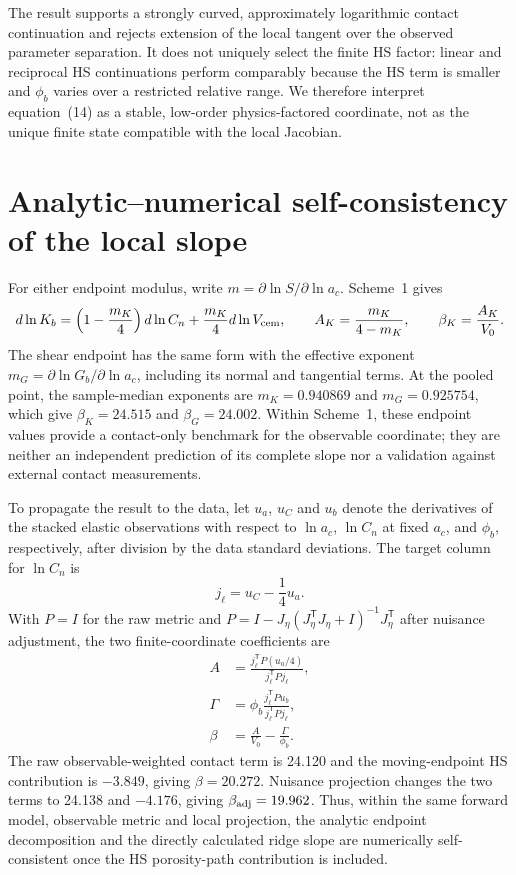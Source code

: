 The result supports a strongly curved, approximately logarithmic contact
continuation and rejects extension of the local tangent over the observed
parameter separation.  It does not uniquely select the finite HS factor:
linear and reciprocal HS continuations perform comparably because the HS
term is smaller and $\phi_b$ varies over a restricted relative range.  We
therefore interpret equation~(14) as a stable, low-order physics-factored
coordinate, not as the unique finite state compatible with the local
Jacobian.

\section{Analytic--numerical self-consistency of the local slope}

For either endpoint modulus, write
$m=\partial\ln S/\partial\ln a_c$.  Scheme~1 gives
\begin{equation}
 d\ln K_b=\left(1-\frac{m_K}{4}\right)d\ln C_n
          +\frac{m_K}{4}d\ln V_{\rm cem},
 \qquad
 A_K=\frac{m_K}{4-m_K},
 \qquad
 \beta_K=\frac{A_K}{V_0}.
\end{equation}
The shear endpoint has the same form with the effective exponent
$m_G=\partial\ln G_b/\partial\ln a_c$, including its normal and tangential
terms.  At the pooled point, the sample-median exponents are
$m_K=0.940869$ and $m_G=0.925754$, which give
$\beta_K=24.515$ and $\beta_G=24.002$.  Within Scheme~1, these endpoint
values provide a contact-only benchmark for the observable coordinate;
they are neither an independent prediction of its complete slope nor a
validation against external contact measurements.

To propagate the result to the data, let $u_a$, $u_C$ and $u_b$ denote the
derivatives of the stacked elastic observations with respect to
$\ln a_c$, $\ln C_n$ at fixed $a_c$, and $\phi_b$, respectively, after
division by the data standard deviations.  The target column for
$\ln C_n$ is
\begin{equation}
 j_\ell=u_C-\frac14u_a.
\end{equation}
With $P=I$ for the raw metric and
$P=I-J_\eta(J_\eta^{\mathsf T}J_\eta+I)^{-1}J_\eta^{\mathsf T}$ after
nuisance adjustment, the two finite-coordinate coefficients are
\begin{align}
 A &=
 \frac{j_\ell^{\mathsf T}P(u_a/4)}
      {j_\ell^{\mathsf T}Pj_\ell},\\
 \Gamma &=
 \phi_b\frac{j_\ell^{\mathsf T}Pu_b}
               {j_\ell^{\mathsf T}Pj_\ell},\\
 \beta &= \frac{A}{V_0}-\frac{\Gamma}{\phi_b}.
\end{align}
The raw observable-weighted contact term is 24.120 and the moving-endpoint
HS contribution is $-3.849$, giving $\beta=20.272$.  Nuisance projection
changes the two terms to 24.138 and $-4.176$, giving $\beta_{\rm adj}=19.962$.
Thus, within the same forward model, observable metric and local projection,
the analytic endpoint decomposition and the directly calculated ridge slope
are numerically self-consistent once the HS porosity-path contribution is
included.

